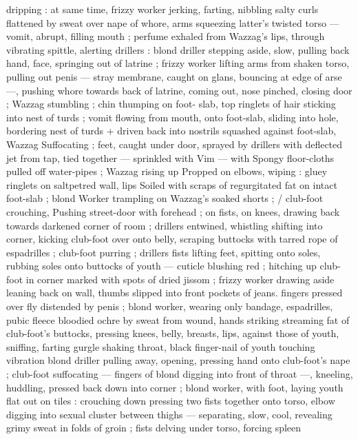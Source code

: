 dripping : at same time, frizzy worker jerking, farting, nibbling salty 
curls flattened by sweat over nape of whore, arms squeezing latter's 
twisted torso --- vomit, abrupt, filling mouth ; perfume exhaled from 
Wazzag's lips, through vibrating spittle, alerting drillers : blond 
driller stepping aside, slow, pulling back hand, face, springing out of 
latrine ; frizzy worker lifting arms from shaken torso, pulling out 
penis --- stray membrane, caught on glans, bouncing at edge of arse 
---, pushing whore towards back of latrine, coming out, nose 
pinched, closing door ; Wazzag stumbling ; chin thumping on foot- 
slab, top ringlets of hair sticking into nest of turds ; vomit flowing 
from mouth, onto foot-slab, sliding into hole, bordering nest of turds 
+ driven back into nostrils squashed against foot-slab, Wazzag 
Suffocating ; feet, caught under door, sprayed by drillers with 
deflected jet from tap, tied together --- sprinkled with Vim --- with 
Spongy floor-cloths pulled off water-pipes ; Wazzag rising up 
Propped on elbows, wiping : gluey ringlets on saltpetred wall, lips 
Soiled with scraps of regurgitated fat on intact foot-slab ; blond 
Worker trampling on Wazzag's soaked shorts ; {\slash} club-foot crouching, 
Pushing street-door with forehead ; on fists, on knees, drawing back 
towards darkened corner of room ; drillers entwined, whistling 
shifting into corner, kicking club-foot over onto belly, scraping 
buttocks with tarred rope of espadrilles ; club-foot purring ; drillers 
fists lifting feet, spitting onto soles, rubbing soles onto buttocks of 
youth --- cuticle blushing red ; hitching up club-foot in corner 
marked with spots of dried jissom ; frizzy worker drawing aside 
leaning back on wall, thumbs slipped into front pockets of jeans. 
fingers pressed over fly distended by penis ; blond worker, wearing 
only bandage, espadrilles, pubic fleece bloodied ochre by sweat from 
wound, hands striking streaming fat of club-foot's buttocks, pressing 
knees, belly, breasts, lips, against those of youth, sniffing, farting 
gurgle shaking throat, black finger-nail of youth touching vibration 
blond driller pulling away, opening, pressing hand onto club-foot's 
nape ; club-foot suffocating --- fingers of blond digging into front of 
throat ---, kneeling, huddling, pressed back down into corner ; blond 
worker, with foot, laying youth flat out on tiles : crouching down 
pressing two fists together onto torso, elbow digging into sexual 
cluster between thighs --- separating, slow, cool, revealing grimy 
sweat in folds of groin ; fists delving under torso, forcing spleen 
